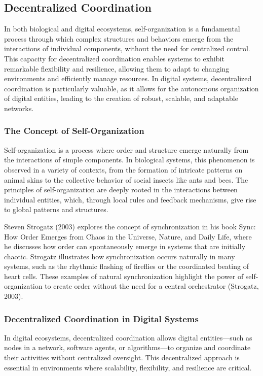\documentclass[12pt,twoside]{article}
\begin{document}
\subsection{Decentralized Coordination}

In both biological and digital ecosystems, self-organization is a fundamental process through which complex structures and behaviors emerge from the interactions of individual components, without the need for centralized control. This capacity for decentralized coordination enables systems to exhibit remarkable flexibility and resilience, allowing them to adapt to changing environments and efficiently manage resources. In digital systems, decentralized coordination is particularly valuable, as it allows for the autonomous organization of digital entities, leading to the creation of robust, scalable, and adaptable networks.

\subsubsection{The Concept of Self-Organization}

Self-organization is a process where order and structure emerge naturally from the interactions of simple components. In biological systems, this phenomenon is observed in a variety of contexts, from the formation of intricate patterns on animal skins to the collective behavior of social insects like ants and bees. The principles of self-organization are deeply rooted in the interactions between individual entities, which, through local rules and feedback mechanisms, give rise to global patterns and structures.

Steven Strogatz (2003) explores the concept of synchronization in his book Sync: How Order Emerges from Chaos in the Universe, Nature, and Daily Life, where he discusses how order can spontaneously emerge in systems that are initially chaotic. Strogatz illustrates how synchronization occurs naturally in many systems, such as the rhythmic flashing of fireflies or the coordinated beating of heart cells. These examples of natural synchronization highlight the power of self-organization to create order without the need for a central orchestrator (Strogatz, 2003).

\subsubsection{Decentralized Coordination in Digital Systems}

In digital ecosystems, decentralized coordination allows digital entities—such as nodes in a network, software agents, or algorithms—to organize and coordinate their activities without centralized oversight. This decentralized approach is essential in environments where scalability, flexibility, and resilience are critical.
\end{document}

